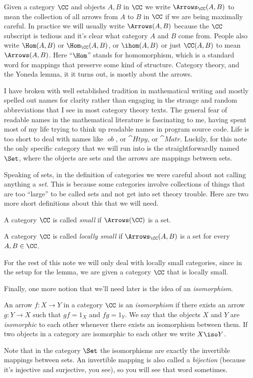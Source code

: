 \noindent
Given a category $\CC$ and objects $A, B$ in $\CC$ we write 
$\Arrows_{\CC}(A, B)$ to mean the collection of all arrows 
from $A$ to $B$ in $\CC$ if we are being maximally careful. In practice
we will usually write $\Arrows(A,B)$ because the $\CC$ subscript is tedious and
it's clear what category $A$ and $B$ come from. People
also write $\Hom(A, B)$ or $\Hom_{\CC}(A,B)$, or $\ihom(A, B)$ or just $\CC(A,B)$ to mean
$\Arrows(A,B)$. Here ``$\Hom$'' stands for homomorphism, which is a standard word for
mappings that preserve some kind of structure. Category theory, and the Yoneda lemma, it
it turns out, is mostly about the arrows.

\goodbreak
I have broken with well established tradition in mathematical writing and mostly
spelled out names for clarity rather than engaging in the strange and random abbreviations
that I see in most category theory texts. The general fear of readable names in the
mathematical literature is fascinating to me, having spent most of my life trying to think
up readable names in program source code. Life is too short to deal with names like
$\mathop{\mathit{ob}}$, or $\cat{Htpy}$, or $\cat{Matr}$. Luckily, for this note the only
specific category that we will run into is the straightforwardly named $\Set$, 
where the objects are sets and the
arrows are mappings between sets.

Speaking of sets, in the definition of categories we were careful about not calling
anything a {\it set}. This is because some categories involve collections of things that
are too ``large'' to be called sets and not get into set theory trouble. Here are two more
short definitions about this that we will need.

\begin{defn}
A category $\CC$ is called {\it small} if $\Arrows(\CC)$ is a set.
\end{defn}

\begin{defn}
A category $\CC$ is called {\it locally small} if $\Arrows_{\CC}(A,B)$ is a set for every
$A, B \in \CC$. \end{defn}%
\noindent
For the rest of this note we will only deal with locally small categories, since in the
setup for the lemma, we are given a category $\CC$ that is locally small.

Finally, one more notion that we'll need later is the idea of an {\it isomorphism}.

\begin{defn}
An arrow $f: X \to Y$ in a category $\CC$ is an {\it isomorphism} if there exists an arrow
$g: Y \to X$ such that $gf = 1_X$ and $fg = 1_Y$. We say that the objects $X$ and $Y$ are
{\it isomorphic} to each other whenever there exists an isomorphism between them. If two
objects in a category are isomorphic to each other we write $X \iso Y$.
\end{defn}
\noindent
Note that in the category $\Set$ the isomorphisms are exactly the invertible mappings
between sets. An invertible mapping is also called a {\it bijection} (because it's
injective and surjective, you see), so you will see that word sometimes.

